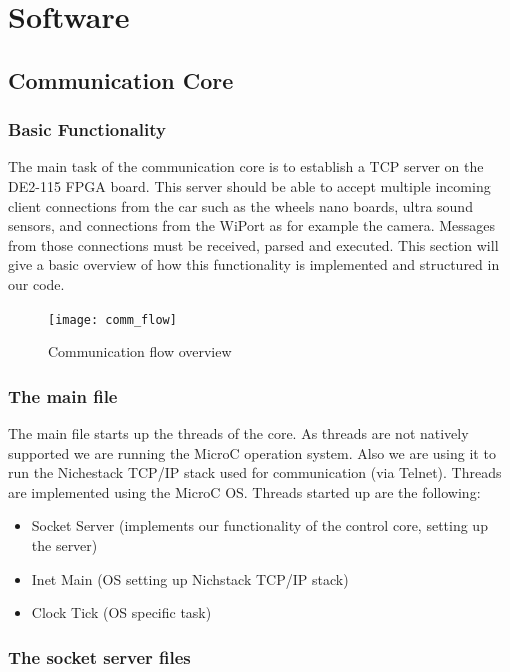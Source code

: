 \chapter{Software}

\section{Communication Core}

\subsection{Basic Functionality}

The main task of the communication core is to establish a TCP server on the DE2-115 FPGA board. This server should be able to accept multiple incoming
client connections from the car such as the wheels nano boards, ultra sound sensors, and connections from the WiPort as for example the camera.
Messages from those connections must be received, parsed and executed. This section will give a basic overview of how this functionality is implemented and 
structured in our code.

\begin{figure}[hb]
\centering
\texttt{[image: comm\_flow]}
\caption {Communication flow overview}
\end{figure}

\subsection{The main file}

The main file starts up the threads of the core. As threads are not natively supported we are running the MicroC operation system. Also
we are using it to run the Nichestack TCP/IP stack used for communication (via Telnet). 
Threads are implemented using the MicroC OS. Threads started up are the following: 
\begin{itemize}
	\item Socket Server (implements our functionality of the control core, setting up the server)
	\item Inet Main (OS setting up Nichstack TCP/IP stack)
	\item Clock Tick (OS specific task)
\end{itemize}

\subsection{The socket server files}

